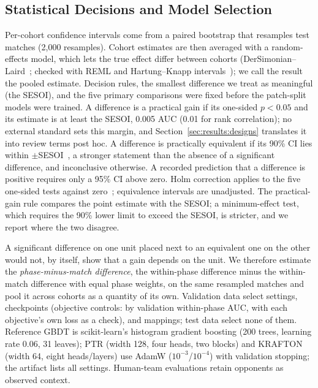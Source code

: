 \documentclass[sigconf,anonymous]{acmart}
\begin{document}
\subsection{Statistical Decisions and Model Selection}
\label{sec:method:stats}
Per-cohort confidence intervals come from a paired bootstrap that resamples test matches (2,000 resamples). Cohort estimates are then averaged with a random-effects model, which lets the true effect differ between cohorts (DerSimonian--Laird~\cite{DerSimonian86}; checked with REML and Hartung--Knapp intervals~\cite{HartungKnapp01}); we call the result the pooled estimate. Decision rules, the smallest difference we treat as meaningful (the SESOI), and the five primary comparisons were fixed before the patch-split models were trained. A difference is a practical gain if its one-sided $p<0.05$ and its estimate is at least the SESOI, 0.005 AUC (0.01 for rank correlation); no external standard sets this margin, and Section~\ref{sec:results:designs} translates it into review terms post hoc. A difference is practically equivalent if its 90\% CI lies within $\pm$SESOI~\cite{Schuirmann87}, a stronger statement than the absence of a significant difference, and inconclusive otherwise. A recorded prediction that a difference is positive requires only a 95\% CI above zero. Holm correction applies to the five one-sided tests against zero~\cite{Holm79}; equivalence intervals are unadjusted. The practical-gain rule compares the point estimate with the SESOI; a minimum-effect test, which requires the 90\% lower limit to exceed the SESOI, is stricter, and we report where the two disagree.

A significant difference on one unit placed next to an equivalent one on the other would not, by itself, show that a gain depends on the unit. We therefore estimate the \emph{phase-minus-match difference}, the within-phase difference minus the within-match difference with equal phase weights, on the same resampled matches and pool it across cohorts as a quantity of its own. Validation data select settings, checkpoints (objective controls: by validation within-phase AUC, with each objective's own loss as a check), and mappings; test data select none of them. Reference GBDT is scikit-learn's histogram gradient boosting (200 trees, learning rate 0.06, 31 leaves); PTR (width 128, four heads, two blocks) and KRAFTON (width 64, eight heads/layers) use AdamW ($10^{-3}$/$10^{-4}$) with validation stopping; the artifact lists all settings. Human-team evaluations retain opponents as observed context.
\end{document}
